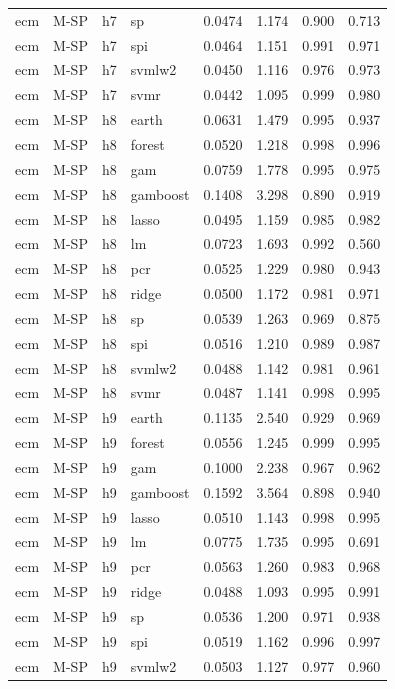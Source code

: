 \begin{ThreePartTable}
\begin{longtable}[t]{llclcccc}
ecm & M-SP & h7 & sp & 0.0474 & 1.174 & 0.900 & 0.713\\
ecm & M-SP & h7 & spi & 0.0464 & 1.151 & 0.991 & 0.971\\
ecm & M-SP & h7 & svmlw2 & 0.0450 & 1.116 & 0.976 & 0.973\\
ecm & M-SP & h7 & svmr & 0.0442 & 1.095 & 0.999 & 0.980\\
\addlinespace
ecm & M-SP & h8 & earth & 0.0631 & 1.479 & 0.995 & 0.937\\
ecm & M-SP & h8 & forest & 0.0520 & 1.218 & 0.998 & 0.996\\
ecm & M-SP & h8 & gam & 0.0759 & 1.778 & 0.995 & 0.975\\
ecm & M-SP & h8 & gamboost & 0.1408 & 3.298 & 0.890 & 0.919\\
ecm & M-SP & h8 & lasso & 0.0495 & 1.159 & 0.985 & 0.982\\
ecm & M-SP & h8 & lm & 0.0723 & 1.693 & 0.992 & 0.560\\
ecm & M-SP & h8 & pcr & 0.0525 & 1.229 & 0.980 & 0.943\\
ecm & M-SP & h8 & ridge & 0.0500 & 1.172 & 0.981 & 0.971\\
ecm & M-SP & h8 & sp & 0.0539 & 1.263 & 0.969 & 0.875\\
ecm & M-SP & h8 & spi & 0.0516 & 1.210 & 0.989 & 0.987\\
ecm & M-SP & h8 & svmlw2 & 0.0488 & 1.142 & 0.981 & 0.961\\
ecm & M-SP & h8 & svmr & 0.0487 & 1.141 & 0.998 & 0.995\\
\addlinespace
ecm & M-SP & h9 & earth & 0.1135 & 2.540 & 0.929 & 0.969\\
ecm & M-SP & h9 & forest & 0.0556 & 1.245 & 0.999 & 0.995\\
ecm & M-SP & h9 & gam & 0.1000 & 2.238 & 0.967 & 0.962\\
ecm & M-SP & h9 & gamboost & 0.1592 & 3.564 & 0.898 & 0.940\\
ecm & M-SP & h9 & lasso & 0.0510 & 1.143 & 0.998 & 0.995\\
ecm & M-SP & h9 & lm & 0.0775 & 1.735 & 0.995 & 0.691\\
ecm & M-SP & h9 & pcr & 0.0563 & 1.260 & 0.983 & 0.968\\
ecm & M-SP & h9 & ridge & 0.0488 & 1.093 & 0.995 & 0.991\\
ecm & M-SP & h9 & sp & 0.0536 & 1.200 & 0.971 & 0.938\\
ecm & M-SP & h9 & spi & 0.0519 & 1.162 & 0.996 & 0.997\\
ecm & M-SP & h9 & svmlw2 & 0.0503 & 1.127 & 0.977 & 0.960\\

\end{longtable}
\end{ThreePartTable}
